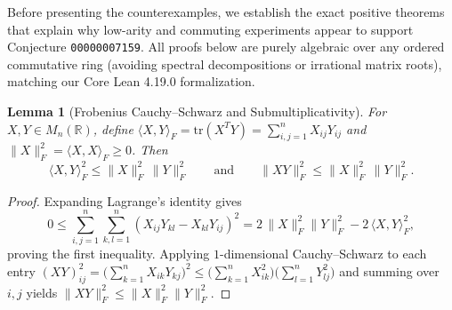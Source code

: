 \documentclass[11pt,a4paper]{article}
\newtheorem{lemma}[theorem]{Lemma}
\theoremstyle{definition}
\theoremstyle{remark}
\newcommand{\tr}{\mathrm{tr}}
\begin{document}
Before presenting the counterexamples, we establish the exact positive theorems that explain why low-arity and commuting experiments appear to support Conjecture \texttt{00000007159}. All proofs below are purely algebraic over any ordered commutative ring (avoiding spectral decompositions or irrational matrix roots), matching our Core Lean 4.19.0 formalization.

\begin{lemma}[Frobenius Cauchy--Schwarz and Submultiplicativity]\label{lem:frob}
For $X, Y \in M_n(\mathbb{R})$, define $\langle X, Y \rangle_F = \tr(X^T Y) = \sum_{i,j=1}^n X_{ij} Y_{ij}$ and $\|X\|_F^2 = \langle X, X \rangle_F \ge 0$. Then
\[
\langle X, Y \rangle_F^2 \le \|X\|_F^2 \, \|Y\|_F^2
\qquad\text{and}\qquad
\|X Y\|_F^2 \le \|X\|_F^2 \, \|Y\|_F^2.
\]
\end{lemma}
\begin{proof}
Expanding Lagrange's identity gives
\[
0 \le \sum_{i,j=1}^n \sum_{k,l=1}^n (X_{ij} Y_{kl} - X_{kl} Y_{ij})^2
= 2\,\|X\|_F^2 \|Y\|_F^2 - 2\,\langle X, Y \rangle_F^2,
\]
proving the first inequality. Applying $1$-dimensional Cauchy--Schwarz to each entry $(XY)_{ij}^2 = \bigl(\sum_{k=1}^n X_{ik} Y_{kj}\bigr)^2 \le \bigl(\sum_{k=1}^n X_{ik}^2\bigr)\bigl(\sum_{l=1}^n Y_{lj}^2\bigr)$ and summing over $i,j$ yields $\|XY\|_F^2 \le \|X\|_F^2 \|Y\|_F^2$.
\end{proof}
\end{document}
